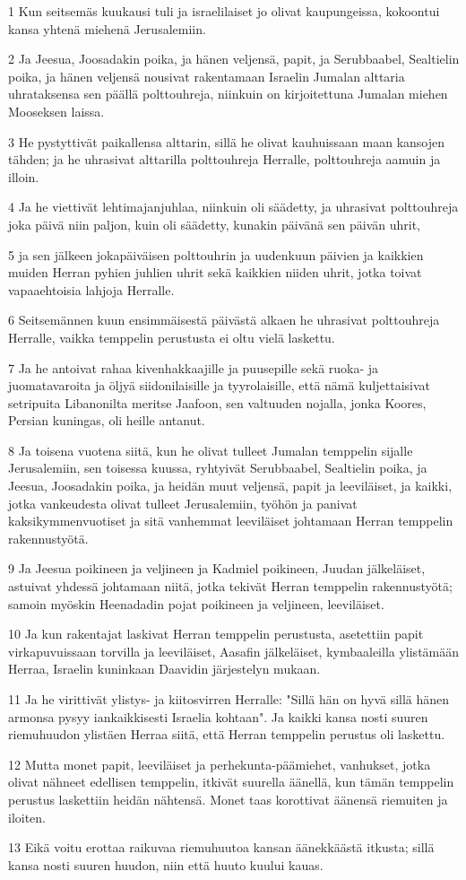 \par 1 Kun seitsemäs kuukausi tuli ja israelilaiset jo olivat kaupungeissa, kokoontui kansa yhtenä miehenä Jerusalemiin.
\par 2 Ja Jeesua, Joosadakin poika, ja hänen veljensä, papit, ja Serubbaabel, Sealtielin poika, ja hänen veljensä nousivat rakentamaan Israelin Jumalan alttaria uhrataksensa sen päällä polttouhreja, niinkuin on kirjoitettuna Jumalan miehen Mooseksen laissa.
\par 3 He pystyttivät paikallensa alttarin, sillä he olivat kauhuissaan maan kansojen tähden; ja he uhrasivat alttarilla polttouhreja Herralle, polttouhreja aamuin ja illoin.
\par 4 Ja he viettivät lehtimajanjuhlaa, niinkuin oli säädetty, ja uhrasivat polttouhreja joka päivä niin paljon, kuin oli säädetty, kunakin päivänä sen päivän uhrit,
\par 5 ja sen jälkeen jokapäiväisen polttouhrin ja uudenkuun päivien ja kaikkien muiden Herran pyhien juhlien uhrit sekä kaikkien niiden uhrit, jotka toivat vapaaehtoisia lahjoja Herralle.
\par 6 Seitsemännen kuun ensimmäisestä päivästä alkaen he uhrasivat polttouhreja Herralle, vaikka temppelin perustusta ei oltu vielä laskettu.
\par 7 Ja he antoivat rahaa kivenhakkaajille ja puusepille sekä ruoka- ja juomatavaroita ja öljyä siidonilaisille ja tyyrolaisille, että nämä kuljettaisivat setripuita Libanonilta meritse Jaafoon, sen valtuuden nojalla, jonka Koores, Persian kuningas, oli heille antanut.
\par 8 Ja toisena vuotena siitä, kun he olivat tulleet Jumalan temppelin sijalle Jerusalemiin, sen toisessa kuussa, ryhtyivät Serubbaabel, Sealtielin poika, ja Jeesua, Joosadakin poika, ja heidän muut veljensä, papit ja leeviläiset, ja kaikki, jotka vankeudesta olivat tulleet Jerusalemiin, työhön ja panivat kaksikymmenvuotiset ja sitä vanhemmat leeviläiset johtamaan Herran temppelin rakennustyötä.
\par 9 Ja Jeesua poikineen ja veljineen ja Kadmiel poikineen, Juudan jälkeläiset, astuivat yhdessä johtamaan niitä, jotka tekivät Herran temppelin rakennustyötä; samoin myöskin Heenadadin pojat poikineen ja veljineen, leeviläiset.
\par 10 Ja kun rakentajat laskivat Herran temppelin perustusta, asetettiin papit virkapuvuissaan torvilla ja leeviläiset, Aasafin jälkeläiset, kymbaaleilla ylistämään Herraa, Israelin kuninkaan Daavidin järjestelyn mukaan.
\par 11 Ja he virittivät ylistys- ja kiitosvirren Herralle: "Sillä hän on hyvä sillä hänen armonsa pysyy iankaikkisesti Israelia kohtaan". Ja kaikki kansa nosti suuren riemuhuudon ylistäen Herraa siitä, että Herran temppelin perustus oli laskettu.
\par 12 Mutta monet papit, leeviläiset ja perhekunta-päämiehet, vanhukset, jotka olivat nähneet edellisen temppelin, itkivät suurella äänellä, kun tämän temppelin perustus laskettiin heidän nähtensä. Monet taas korottivat äänensä riemuiten ja iloiten.
\par 13 Eikä voitu erottaa raikuvaa riemuhuutoa kansan äänekkäästä itkusta; sillä kansa nosti suuren huudon, niin että huuto kuului kauas.

